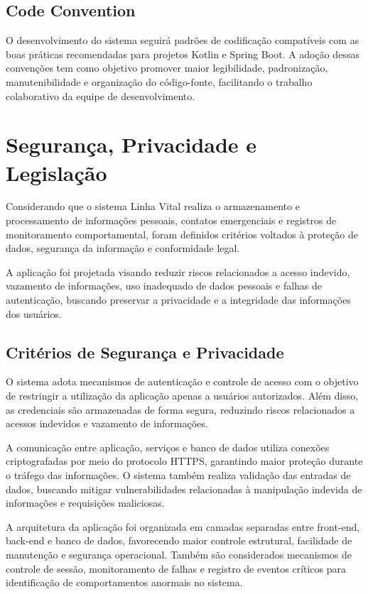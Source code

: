 \subsection{Code Convention}

O desenvolvimento do sistema seguirá padrões de codificação compatíveis com as boas práticas recomendadas para projetos Kotlin e Spring Boot. A adoção dessas convenções tem como objetivo promover maior legibilidade, padronização, manutenibilidade e organização do código-fonte, facilitando o trabalho colaborativo da equipe de desenvolvimento.

\section{Segurança, Privacidade e Legislação}

Considerando que o sistema Linha Vital realiza o armazenamento e processamento de informações pessoais, contatos emergenciais e registros de monitoramento comportamental, foram definidos critérios voltados à proteção de dados, segurança da informação e conformidade legal.

A aplicação foi projetada visando reduzir riscos relacionados a acesso indevido, vazamento de informações, uso inadequado de dados pessoais e falhas de autenticação, buscando preservar a privacidade e a integridade das informações dos usuários.

\subsection{Critérios de Segurança e Privacidade}

O sistema adota mecanismos de autenticação e controle de acesso com o objetivo de restringir a utilização da aplicação apenas a usuários autorizados. Além disso, as credenciais são armazenadas de forma segura, reduzindo riscos relacionados a acessos indevidos e vazamento de informações.

A comunicação entre aplicação, serviços e banco de dados utiliza conexões criptografadas por meio do protocolo HTTPS, garantindo maior proteção durante o tráfego das informações. O sistema também realiza validação das entradas de dados, buscando mitigar vulnerabilidades relacionadas à manipulação indevida de informações e requisições maliciosas.

A arquitetura da aplicação foi organizada em camadas separadas entre front-end, back-end e banco de dados, favorecendo maior controle estrutural, facilidade de manutenção e segurança operacional. Também são considerados mecanismos de controle de sessão, monitoramento de falhas e registro de eventos críticos para identificação de comportamentos anormais no sistema.

